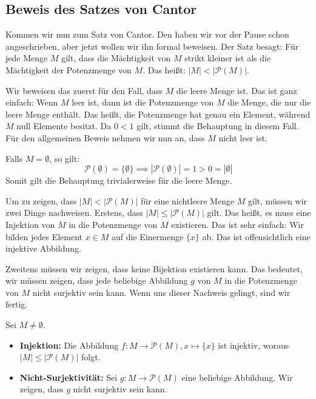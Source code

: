\subsection{Beweis des Satzes von Cantor}

\begin{spoken-clean}[00:59:25 - 01:00:55]
Kommen wir nun zum Satz von Cantor. Den haben wir vor der Pause schon angeschrieben, aber jetzt wollen wir ihn formal beweisen. Der Satz besagt: Für jede Menge $M$ gilt, dass die Mächtigkeit von $M$ strikt kleiner ist als die Mächtigkeit der Potenzmenge von $M$. Das heißt: $|M| < |\mathcal{P}(M)|$.

Wir beweisen das zuerst für den Fall, dass $M$ die leere Menge ist. Das ist ganz einfach: Wenn $M$ leer ist, dann ist die Potenzmenge von $M$ die Menge, die nur die leere Menge enthält. Das heißt, die Potenzmenge hat genau ein Element, während $M$ null Elemente besitzt. Da $0 < 1$ gilt, stimmt die Behauptung in diesem Fall. Für den allgemeinen Beweis nehmen wir nun an, dass $M$ nicht leer ist.
\end{spoken-clean}

\begin{math-stroke}
\begin{short-proof}[Beweis von \cref{thm:cantor} für $M = \emptyset$]
Falls $M = \emptyset$, so gilt:
\[
\mathcal{P}(\emptyset) = \{\emptyset\} \implies |\mathcal{P}(\emptyset)| = 1 > 0 = |\emptyset|
\]
Somit gilt die Behauptung trivialerweise für die leere Menge.
\end{short-proof}
\end{math-stroke}

\begin{spoken-clean}[01:00:55 - 01:02:29]
Um zu zeigen, dass $|M| < |\mathcal{P}(M)|$ für eine nichtleere Menge $M$ gilt, müssen wir zwei Dinge nachweisen. Erstens, dass $|M| \le |\mathcal{P}(M)|$ gilt. Das heißt, es muss eine Injektion von $M$ in die Potenzmenge von $M$ existieren. Das ist sehr einfach: Wir bilden jedes Element $x \in M$ auf die Einermenge $\{x\}$ ab. Das ist offensichtlich eine injektive Abbildung.

Zweitens müssen wir zeigen, dass keine Bijektion existieren kann. Das bedeutet, wir müssen zeigen, dass jede beliebige Abbildung $g$ von $M$ in die Potenzmenge von $M$ nicht surjektiv sein kann. Wenn uns dieser Nachweis gelingt, sind wir fertig.
\end{spoken-clean}

\begin{math-stroke}
Sei $M \neq \emptyset$.
\begin{itemize}
    \item \textbf{Injektion:} Die Abbildung $f \colon M \to \mathcal{P}(M), x \mapsto \{x\}$ ist injektiv, woraus $|M| \le |\mathcal{P}(M)|$ folgt.
    \item \textbf{Nicht-Surjektivität:} Sei $g \colon M \to \mathcal{P}(M)$ eine beliebige Abbildung. Wir zeigen, dass $g$ nicht surjektiv sein kann.
\end{itemize}
\end{math-stroke}


